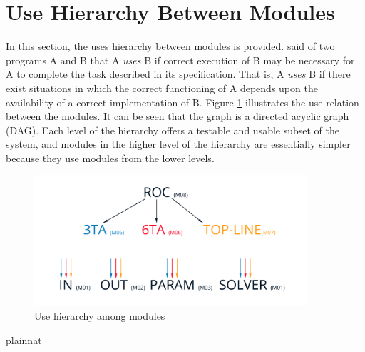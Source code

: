 \documentclass[12pt, titlepage]{article}
\begin{document}
\section{Use Hierarchy Between Modules} \label{SecUse}

In this section, the uses hierarchy between modules is
provided. \citet{Parnas1978} said of two programs A and B that A {\em uses} B if
correct execution of B may be necessary for A to complete the task described in
its specification. That is, A {\em uses} B if there exist situations in which
the correct functioning of A depends upon the availability of a correct
implementation of B.  Figure \ref{FigUH} illustrates the use relation between
the modules. It can be seen that the graph is a directed acyclic graph
(DAG). Each level of the hierarchy offers a testable and usable subset of the
system, and modules in the higher level of the hierarchy are essentially simpler
because they use modules from the lower levels.

\begin{figure}[H]
\centering
\includegraphics[width=0.9\textwidth]{roc-uses-diagram.jpg}
\caption{Use hierarchy among modules}
\label{FigUH}
\end{figure}


 {plainnat}

\end{document}
